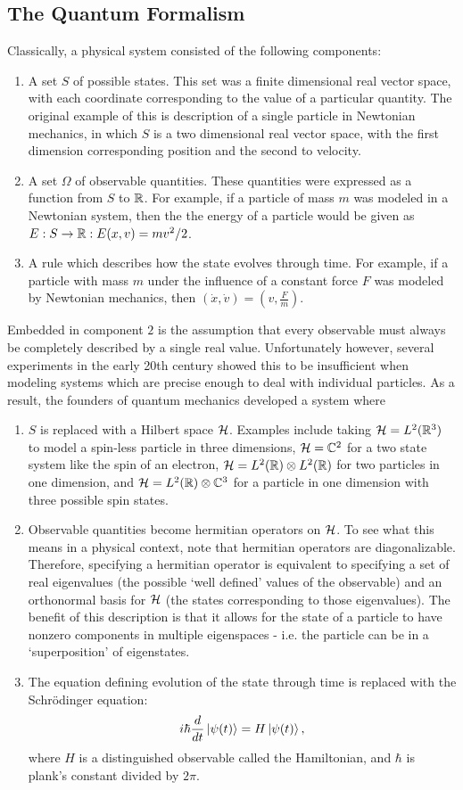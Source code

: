 \documentclass[a4paper]{article}
\begin{document}
\subsection{The Quantum Formalism}
Classically, a physical system consisted of the following components: 
\begin{enumerate}
    \item A set $S$ of possible states. This set was a finite dimensional real vector space, with each coordinate corresponding to the value of a particular quantity. The original example of this is description of a single particle in Newtonian mechanics, in which $S$ is a two dimensional real vector space, with the first dimension corresponding position and the second to velocity.
    \item A set $\Omega$ of observable quantities. These quantities were expressed as a function from $S$ to $\mathbb{R}$. For example, if a particle of mass $m$ was modeled in a Newtonian system, then the the energy of a particle would be given as $E: S \to \mathbb{R} : E(x, v) = mv^2/2$.
    \item A rule which describes how the state evolves through time. For example, if a particle with mass $m$ under the influence of a constant force $F$ was modeled by Newtonian mechanics, then $(\dot{x}, \dot{v}) = (v, \frac{F}{m})$.
\end{enumerate}
Embedded in component $2$ is the assumption that every observable must always be completely described by a single real value. Unfortunately however, several experiments in the early 20th century showed this to be insufficient when modeling systems which are precise enough to deal with individual particles. As a result, the founders of quantum mechanics developed a system where
\begin{enumerate}
    \item $S$ is replaced with a Hilbert space $\mathcal{H}$. Examples include taking $\mathcal{H} = L^2(\mathbb{R}^3)$ to model a spin-less particle in three dimensions, $\mathcal{H} = \mathbb{C}^2$ for a two state system like the spin of an electron, $\mathcal{H} = L^2(\mathbb{R}) \otimes L^2(\mathbb{R})$ for two particles in one dimension, and $\mathcal{H} = L^2(\mathbb{R}) \otimes \mathbb{C}^3$ for a particle in one dimension with three possible spin states.
    \item Observable quantities become hermitian operators on $\mathcal{H}$. To see what this means in a physical context, note that hermitian operators are diagonalizable. Therefore, specifying a hermitian operator is equivalent to specifying a set of real eigenvalues (the possible `well defined' values of the observable) and an orthonormal basis for $\mathcal{H}$ (the states corresponding to those eigenvalues). The benefit of this  description is that it allows for the state of a particle to have nonzero components in multiple eigenspaces - i.e. the particle can be in a `superposition' of eigenstates. 
    \item The equation defining evolution of the state through time is replaced with the Schr\"{o}dinger equation: 
    $$i\hbar\frac{d}{dt}\left\lvert \psi(t) \right\rangle = H\left\lvert \psi(t) \right\rangle,$$
    where $H$ is a distinguished observable called the Hamiltonian, and $\hbar$ is plank's constant divided by $2 \pi$.
\end{enumerate}
\end{document}
